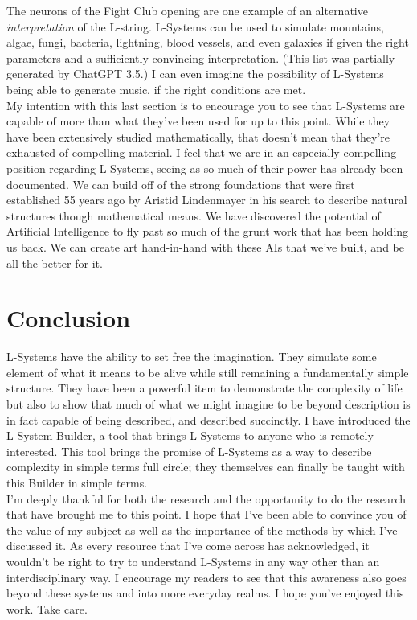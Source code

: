 \documentclass[12pt,twoside]{reedthesis}
\begin{document}
	The neurons of the Fight Club opening are one example of an alternative \textit{interpretation} of the L-string. L-Systems can be used to simulate mountains, algae, fungi, bacteria, lightning, blood vessels, and even galaxies if given the right parameters and a sufficiently convincing interpretation. (This list was partially generated by ChatGPT 3.5.) I can even imagine the possibility of L-Systems being able to generate music, if the right conditions are met.\\
	
	My intention with this last section is to encourage you to see that L-Systems are capable of more than what they've been used for up to this point. While they have been extensively studied mathematically, that doesn't mean that they're exhausted of compelling material. I feel that we are in an especially compelling position regarding L-Systems, seeing as so much of their power has already been documented. We can build off of the strong foundations that were first established 55 years ago by Aristid Lindenmayer in his search to describe natural structures though mathematical means. We have discovered the potential of Artificial Intelligence to fly past so much of the grunt work that has been holding us back. We can create art hand-in-hand with these AIs that we've built, and be all the better for it.\\
	
\chapter{Conclusion}
	\setcounter{section}{0}
	
	L-Systems have the ability to set free the imagination. They simulate some element of what it means to be alive while still remaining a fundamentally simple structure. They have been a powerful item to demonstrate the complexity of life but also to show that much of what we might imagine to be beyond description is in fact capable of being described, and described succinctly. I have introduced the L-System Builder, a tool that brings L-Systems to anyone who is remotely interested. This tool brings the promise of L-Systems as a way to describe complexity in simple terms full circle; they themselves can finally be taught with this Builder in simple terms.\\
	
	I'm deeply thankful for both the research and the opportunity to do the research that have brought me to this point. I hope that I've been able to convince you of the value of my subject as well as the importance of the methods by which I've discussed it. As every resource that I've come across has acknowledged, it wouldn't be right to try to understand L-Systems in any way other than an interdisciplinary way. I encourage my readers to see that this awareness also goes beyond these systems and into more everyday realms. I hope you've enjoyed this work. Take care.
\end{document}
